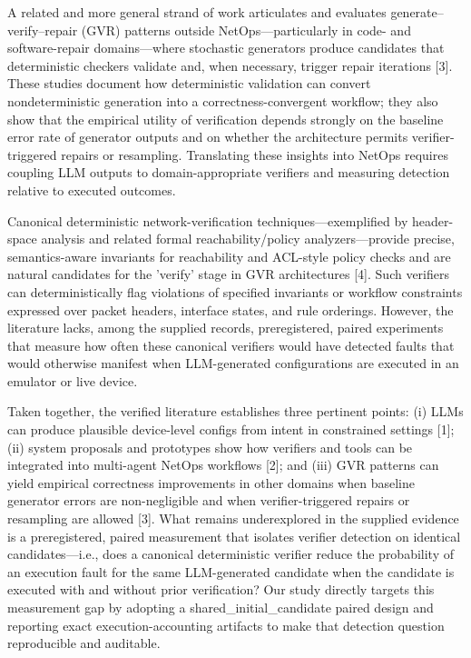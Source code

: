 \documentclass[conference]{IEEEtran}
\begin{document}
A related and more general strand of work articulates and evaluates generate--verify--repair (GVR) patterns outside NetOps---particularly in code- and software-repair domains---where stochastic generators produce candidates that deterministic checkers validate and, when necessary, trigger repair iterations [3]. These studies document how deterministic validation can convert nondeterministic generation into a correctness-convergent workflow; they also show that the empirical utility of verification depends strongly on the baseline error rate of generator outputs and on whether the architecture permits verifier-triggered repairs or resampling. Translating these insights into NetOps requires coupling LLM outputs to domain-appropriate verifiers and measuring detection relative to executed outcomes.

Canonical deterministic network-verification techniques---exemplified by header-space analysis and related formal reachability/policy analyzers---provide precise, semantics-aware invariants for reachability and ACL-style policy checks and are natural candidates for the 'verify' stage in GVR architectures [4]. Such verifiers can deterministically flag violations of specified invariants or workflow constraints expressed over packet headers, interface states, and rule orderings. However, the literature lacks, among the supplied records, preregistered, paired experiments that measure how often these canonical verifiers would have detected faults that would otherwise manifest when LLM-generated configurations are executed in an emulator or live device.

Taken together, the verified literature establishes three pertinent points: (i) LLMs can produce plausible device-level configs from intent in constrained settings [1]; (ii) system proposals and prototypes show how verifiers and tools can be integrated into multi-agent NetOps workflows [2]; and (iii) GVR patterns can yield empirical correctness improvements in other domains when baseline generator errors are non-negligible and when verifier-triggered repairs or resampling are allowed [3]. What remains underexplored in the supplied evidence is a preregistered, paired measurement that isolates verifier detection on identical candidates---i.e., does a canonical deterministic verifier reduce the probability of an execution fault for the same LLM-generated candidate when the candidate is executed with and without prior verification? Our study directly targets this measurement gap by adopting a shared\_initial\_candidate paired design and reporting exact execution-accounting artifacts to make that detection question reproducible and auditable.
\end{document}
